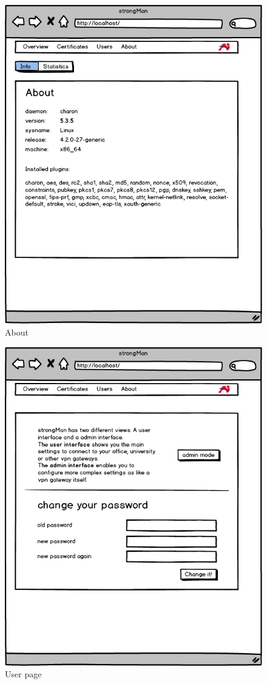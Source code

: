 \begin{figure}[H]
	\centering
	\includegraphics[width=400pt]{images/mockups/About.png}
	\caption{About}
\end{figure}

\begin{figure}[H]
	\centering
	\includegraphics[width=400pt]{images/mockups/user_pw_change.png}
	\caption{User page}
\end{figure}
